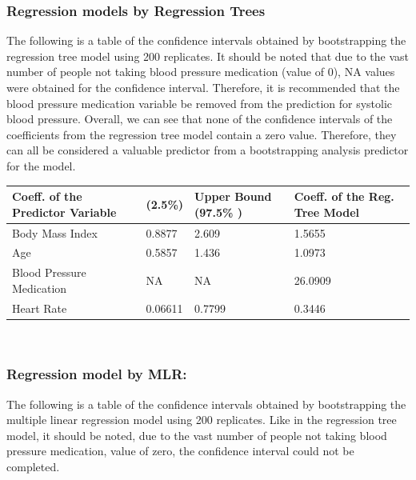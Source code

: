 \documentclass{article}\usepackage[]{graphicx}\usepackage[]{color}
\begin{document}
\subsubsection*{Regression models by Regression Trees}

The following is a table of the confidence intervals obtained by bootstrapping the regression tree model using 200 replicates.  It should be noted that due to the vast number of people not taking blood pressure medication (value of 0), NA values were obtained for the confidence interval.  Therefore, it is recommended that the blood pressure medication variable be removed from the prediction for systolic blood pressure.  Overall, we can see that none of the confidence intervals of the coefficients from the regression tree model contain a zero value.  Therefore, they can all be considered a valuable predictor from a bootstrapping analysis predictor for the model.

\begin{table}[h]
\begin{small}
    \begin{tabular}{llll}
    \hline \textbf{Coeff. of the Predictor Variable} & \textbf{ (2.5\%)} & \textbf{Upper Bound (97.5\% )} & \textbf{Coeff. of the Reg. Tree Model}\\ \hline
    Body Mass Index                                  & 0.8877              & 2.609       &   1.5655       \\
    Age                                   & 0.5857              & 1.436        &  1.0973       \\
    Blood Pressure Medication                                & NA                  & NA          & 26.0909         \\
    Heart Rate                              & 0.06611             & 0.7799    &   0.3446         \\
    \end{tabular}
    \end{small}
\end{table}

\

\subsubsection*{Regression model by MLR:}


The following is a table of the confidence intervals obtained by bootstrapping the multiple linear regression model using 200 replicates.  Like in the regression tree model, it should be noted, due to the vast number of people not taking blood pressure medication, value of zero, the confidence interval could not be completed.
\end{document}
